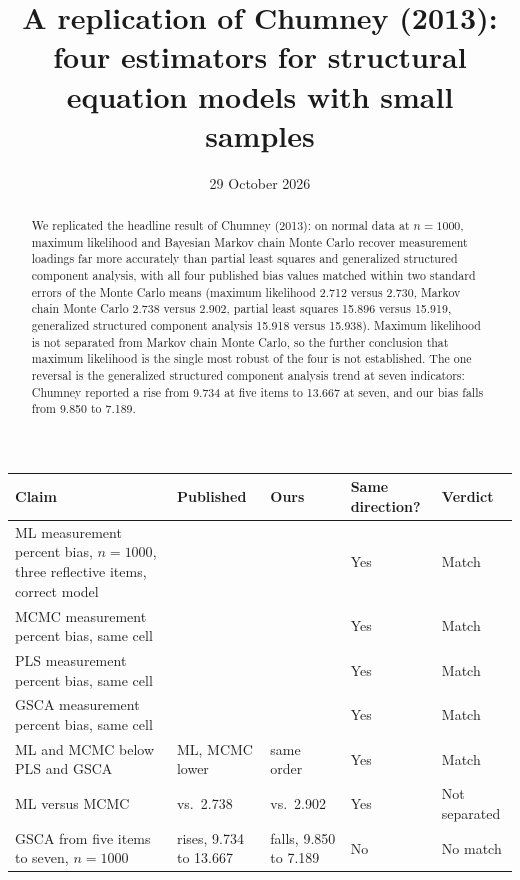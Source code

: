\documentclass[11pt]{article}
\title{A replication of Chumney (2013):\\
four estimators for structural equation models with small samples}
\author{}
\date{29 October 2026}
\renewcommand{\arraystretch}{1.35}
\begin{document}
\maketitle

\begin{abstract}
We replicated the headline result of Chumney (2013): on normal data at
$n = 1000$, maximum likelihood and Bayesian Markov chain Monte Carlo recover
measurement loadings far more accurately than partial least squares and
generalized structured component analysis, with all four published bias
values matched within two standard errors of the Monte Carlo means
(maximum likelihood 2.712 versus 2.730, Markov chain Monte Carlo 2.738
versus 2.902, partial least squares 15.896 versus 15.919, generalized
structured component analysis 15.918 versus 15.938).
Maximum likelihood is not separated from Markov chain Monte Carlo, so the
further conclusion that maximum likelihood is the single most robust of the
four is not established.
The one reversal is the generalized structured component analysis trend at
seven indicators: Chumney reported a rise from 9.734 at five items to
13.667 at seven, and our bias falls from 9.850 to 7.189.
\end{abstract}

\begin{center}
\renewcommand{\arraystretch}{1.45}
\setlength{\tabcolsep}{4pt}
\small
{}
\label{tab:headline}
\vspace{0.4em}

\begin{tabular}{@{}>{\raggedright\arraybackslash}p{}>{\raggedright\arraybackslash}p{}>{\raggedright\arraybackslash}p{}>{\centering\arraybackslash}p{}>{\raggedright\arraybackslash}p{}@{}}
\toprule
Claim & Published & Ours & Same direction? & Verdict \\
\midrule
ML measurement percent bias, $n=1000$, three reflective items, correct model & 2.712 & 2.730 & Yes & Match \\
MCMC measurement percent bias, same cell & 2.738 & 2.902 & Yes & Match \\
PLS measurement percent bias, same cell & 15.896 & 15.919 & Yes & Match \\
GSCA measurement percent bias, same cell & 15.918 & 15.938 & Yes & Match \\
ML and MCMC below PLS and GSCA & ML, MCMC lower & same order & Yes & Match \\
ML versus MCMC & 2.712 vs.\ 2.738 & 2.730 vs.\ 2.902 & Yes & Not separated \\
GSCA from five items to seven, $n=1000$ & rises, 9.734 to 13.667 & falls, 9.850 to 7.189 & No & No match \\
\bottomrule
\end{tabular}
\end{center}
\end{document}
